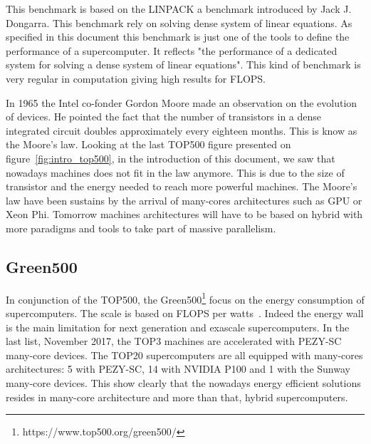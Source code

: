 This benchmark is based on the LINPACK\cite{dongarra1994top500} a benchmark introduced by Jack J. Dongarra.
This benchmark rely on solving  dense system of linear equations. 
As specified in this document this benchmark is just one of the tools to define the performance of a supercomputer. 
It reflects "the performance of a dedicated system for solving a dense system of linear equations".
This kind of benchmark is very regular in computation giving high results for FLOPS. 

In 1965 the Intel co-fonder Gordon Moore made an observation\cite{present2000cramming} on the evolution of devices. 
He pointed the fact that the number of transistors in a dense integrated circuit doubles approximately every eighteen months.
This is know as the Moore's law. 
Looking at the last TOP500 figure presented on figure~\ref{fig:intro_top500}, in the introduction of this document, we saw that nowadays machines does not fit in the law anymore. 
This is due to the size of transistor and the energy needed to reach more powerful machines. 
The Moore's law have been sustains by the arrival of many-cores architectures such as GPU or Xeon Phi. 
Tomorrow machines architectures will have to be based on hybrid with more paradigms and tools to take part of massive parallelism.


\subsection{Green500}
In conjunction of the TOP500, the Green500\footnote{https://www.top500.org/green500/} focus on the energy consumption of supercomputers. 
The scale is based on FLOPS per watts~\cite{feng2007green500}.
Indeed the energy wall is the main limitation for next generation and exascale supercomputers. 
In the last list, November 2017, the TOP3 machines are accelerated with PEZY-SC many-core devices. 
The TOP20 supercomputers are all equipped with many-cores architectures: 5 with PEZY-SC, 14 with NVIDIA P100 and 1 with the Sunway many-core devices. 
This show clearly that the nowadays energy efficient solutions resides in many-core architecture and more than that, hybrid supercomputers. 

